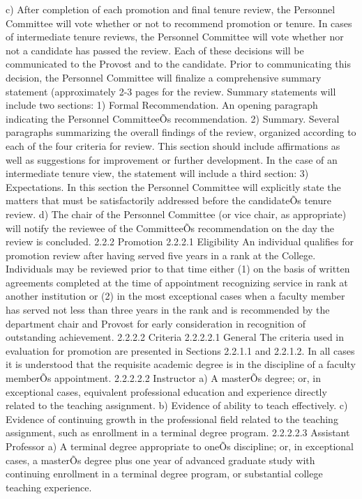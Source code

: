 \documentclass[letterpaper, 11pt]{article}
\begin{document}
c) After completion of each promotion and final tenure review, the Personnel Committee will vote whether or not to recommend promotion or tenure.  In cases of intermediate tenure reviews, the Personnel Committee will vote whether nor not a candidate has passed the review.  Each of these decisions will be communicated to the Provost and to the candidate.  Prior to communicating this decision, the Personnel Committee will finalize a comprehensive summary statement (approximately 2-3 pages for the review.  Summary statements will include two sections:
1) Formal Recommendation.  An opening paragraph indicating the Personnel CommitteeÕs recommendation.
2) Summary.  Several paragraphs summarizing the overall findings of the review, organized according to each of the four criteria for review.  This section should include affirmations as well as suggestions for improvement or further development.
  In the case of an intermediate tenure view, the statement will include a third section:
3) Expectations.  In this section the Personnel Committee will explicitly state the matters that must be satisfactorily addressed before the candidateÕs tenure review.
d)   The chair of the Personnel Committee (or vice chair, as appropriate) will notify the reviewee of the CommitteeÕs recommendation on the day the review is concluded.
2.2.2 Promotion
2.2.2.1 Eligibility
   An individual qualifies for promotion review after having served five years in a rank at the College.  Individuals may be reviewed prior to that time either (1) on the basis of written agreements completed at the time of appointment recognizing service in rank at another institution or (2) in the most exceptional cases when a faculty member has served not less than three years in the rank and is recommended by the department chair and Provost for early consideration in recognition of outstanding achievement.
2.2.2.2 Criteria
2.2.2.2.1 General
   The criteria used in evaluation for promotion are presented in Sections 2.2.1.1 and 2.2.1.2. In all cases it is understood that the requisite academic degree is in the discipline of a faculty memberÕs appointment.
2.2.2.2.2 Instructor
a) A masterÕs degree; or, in exceptional cases, equivalent professional education and experience directly related to the teaching assignment.
b) Evidence of ability to teach effectively.
c) Evidence of continuing growth in the professional field related to the teaching assignment, such as enrollment in a terminal degree program.
2.2.2.2.3 Assistant Professor
a) A terminal degree appropriate to oneÕs discipline; or, in exceptional cases, a masterÕs degree plus one year of advanced graduate study with continuing enrollment in a terminal degree program, or substantial college teaching experience.
\end{document}
